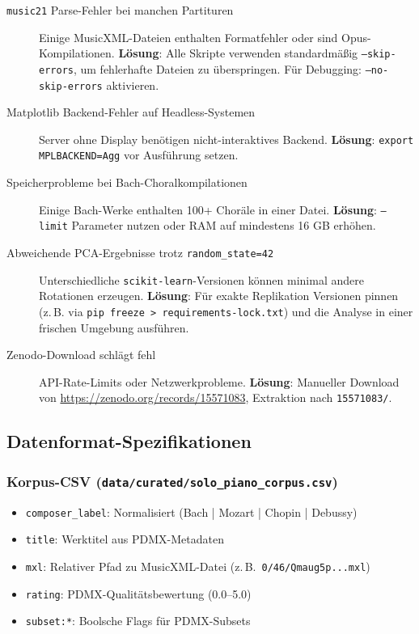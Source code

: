\documentclass[12pt,a4paper]{article}
\theoremstyle{definition}
\begin{document}
\begin{description}
    \item[\texttt{music21} Parse-Fehler bei manchen Partituren] Einige MusicXML-Dateien enthalten Formatfehler oder sind Opus-Kompilationen. \textbf{Lösung}: Alle Skripte verwenden standardmäßig \texttt{--skip-errors}, um fehlerhafte Dateien zu überspringen. Für Debugging: \texttt{--no-skip-errors} aktivieren.
    
    \item[Matplotlib Backend-Fehler auf Headless-Systemen] Server ohne Display benötigen nicht-interaktives Backend. \textbf{Lösung}: \texttt{export MPLBACKEND=Agg} vor Ausführung setzen.
    
    \item[Speicherprobleme bei Bach-Choralkompilationen] Einige Bach-Werke enthalten 100+ Choräle in einer Datei. \textbf{Lösung}: \texttt{--limit} Parameter nutzen oder RAM auf mindestens 16 GB erhöhen.
    
    \item[Abweichende PCA-Ergebnisse trotz \texttt{random\_state=42}] Unterschiedliche \texttt{scikit-learn}-Versionen können minimal andere Rotationen erzeugen. \textbf{Lösung}: Für exakte Replikation Versionen pinnen (z.\,B. via \texttt{pip freeze > requirements-lock.txt}) und die Analyse in einer frischen Umgebung ausführen.
    
    \item[Zenodo-Download schlägt fehl] API-Rate-Limits oder Netzwerkprobleme. \textbf{Lösung}: Manueller Download von \url{https://zenodo.org/records/15571083}, Extraktion nach \texttt{15571083/}.
\end{description}

\subsection{Datenformat-Spezifikationen}

\subsubsection{Korpus-CSV (\texttt{data/curated/solo\_piano\_corpus.csv})}
\begin{itemize}
    \item \texttt{composer\_label}: Normalisiert (Bach | Mozart | Chopin | Debussy)
    \item \texttt{title}: Werktitel aus PDMX-Metadaten
    \item \texttt{mxl}: Relativer Pfad zu MusicXML-Datei (z.\,B.\ \texttt{0/46/Qmaug5p...mxl})
    \item \texttt{rating}: PDMX-Qualitätsbewertung (0.0--5.0)
    \item \texttt{subset:*}: Boolsche Flags für PDMX-Subsets
\end{itemize}
\end{document}
